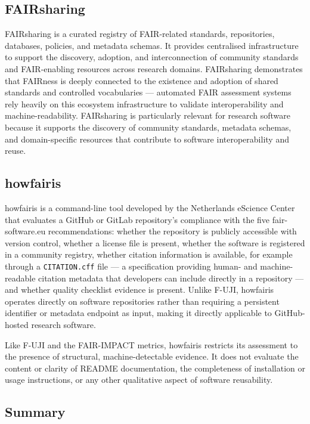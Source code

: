 \subsection{FAIRsharing}

FAIRsharing \cite{sansone2019fairsharing} is a curated registry of FAIR-related standards, 
repositories, databases, policies, and metadata schemas. It provides 
centralised infrastructure to support the discovery, adoption, and 
interconnection of community standards and FAIR-enabling resources 
across research domains. FAIRsharing demonstrates that FAIRness is 
deeply connected to the existence and adoption of shared standards 
and controlled vocabularies — automated FAIR assessment systems rely 
heavily on this ecosystem infrastructure to validate interoperability 
and machine-readability. FAIRsharing is particularly relevant for 
research software because it supports the discovery of community 
standards, metadata schemas, and domain-specific resources that 
contribute to software interoperability and reuse.

\subsection{howfairis}

howfairis \cite{spaaks2020howfairis} is a command-line tool developed
by the Netherlands eScience Center that evaluates a GitHub or GitLab
repository's compliance with the five fair-software.eu
recommendations: whether the repository is publicly accessible with
version control, whether a license file is present, whether the
software is registered in a community registry, whether citation information is available, for example through a
\texttt{CITATION.cff} file — a specification providing human- and
machine-readable citation metadata that developers can include
directly in a repository \cite{druskat2021cff} — and whether quality
checklist evidence is present.
Unlike F-UJI, howfairis operates directly on software repositories rather
than requiring a persistent identifier or metadata endpoint as input,
making it directly applicable to GitHub-hosted research software.

Like F-UJI and the FAIR-IMPACT metrics, howfairis restricts its
assessment to the presence of structural, machine-detectable evidence.
It does not evaluate the content or clarity of README documentation,
the completeness of installation or usage instructions, or any other
qualitative aspect of software reusability.

\subsection{Summary}

